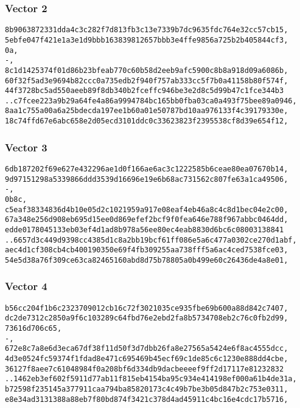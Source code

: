 \documentclass[
]{article}
\begin{document}
\hypertarget{vector-2}{%
\subsubsection{Vector 2}\label{vector-2}}

\begin{verbatim}
8b9063872331dda4c3c282f7d813fb3c13e7339b7dc9635fdc764e32cc57cb15,
5ebfe047f421e1a3e1d9bbb163839812657bbb3e4ffe9856a725b2b405844cf3,
0a,
-,
8c1d1425374f01d86b23bfeab770c60b58d2eeb9afc5900c8b8a918d09a6086b,
60f32f5ad3e9694b82ccc0a735edb2f940f757ab333cc5f7b0a41158b80f574f,
44f3728bc5ad550aeeb89f8db340b2fceffc946be3e2d8c5d99b47c1fce344b3
..c7fcee223a9b29a64fe4a86a9994784bc165bb0fba03ca0a493f75bee89a0946,
8aa1c755a00a6a25bdecda197ee1b60a01e50787bd10aa976133f4c39179330e,
18c74ffd67e6abc658e2d05ecd3101ddc0c33623823f2395538cf8d39e654f12,
\end{verbatim}

\hypertarget{vector-3}{%
\subsubsection{Vector 3}\label{vector-3}}

\begin{verbatim}
6db187202f69e627e432296ae1d0f166ae6ac3c1222585b6ceae80ea07670b14,
9d97151298a5339866ddd3539d16696e19e6b68ac731562c807fe63a1ca49506,
-,
0b8c,
c5eaf38334836d4b10e05d2c1021959a917e08eaf4eb46a8c4c8d1bec04e2c00,
67a348e256d908eb695d15ee0d869efef2bcf9f0fea646e788f967abbc0464dd,
edde0178045133eb03ef4d1ad8b978a56ee80ec4eab8830d6bc6c08003138841
..6657d3c449d9398cc4385d1c8a2bb19bcf61ff086e5a6c477a0302ce270d1abf,
aec4d1cf308cb4cb400190350e69f4fb309255aa738fff5a6ac4ced7538fce03,
54e5d38a76f309ce63ca82465160abd8d75b78805a0b499e60c26436de4a8e01,
\end{verbatim}

\hypertarget{vector-4}{%
\subsubsection{Vector 4}\label{vector-4}}

\begin{verbatim}
b56cc204f1b6c2323709012cb16c72f3021035ce935fbe69b600a88d842c7407,
dc2de7312c2850a9f6c103289c64fbd76e2ebd2fa8b5734708eb2c76c0fb2d99,
73616d706c65,
-,
672e8c7a8e6d3eca67df38f11d50f3d7dbb26fa8e27565a5424e6f8ac4555dcc,
4d3e0524fc59374f1fdad8e471c695469b45ecf69c1de85c6c1230e888dd4cbe,
36127f8aee7c61048984f0a208bf6d334db9dacbeeeef9ff2d17117e81232832
..1462eb3ef602f5911d77ab11f815eb4154ba95c934e414198ef000a61b4de31a,
b72598f235145a377911caa794ba85820173c4c49b7be3b05d847b2c753e0311,
e8e34ad3131388a88eb7f80bd874f3421c378d4ad45911c4bc16e4cdc17b5716,
\end{verbatim}
\end{document}
